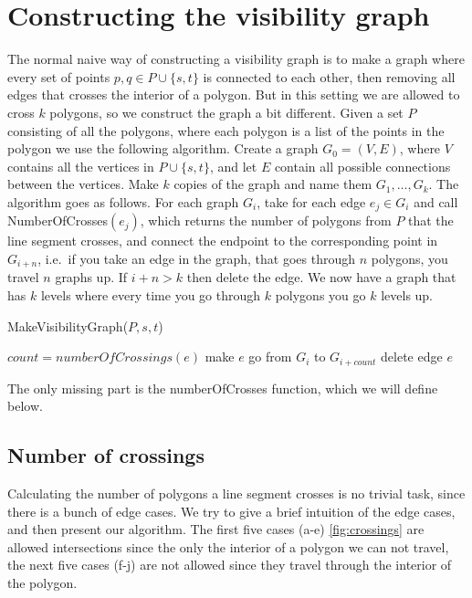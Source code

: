 \section{Constructing the visibility graph}
The normal naive way of constructing a visibility graph is to make a graph
where every set of points $p,q \in P\cup \{s,t\}$ is connected to each other,
then removing all edges that crosses the interior of a polygon. But in this
setting we are allowed to cross $k$ polygons, so we construct the graph a bit
different. Given a set $P$ consisting of all the polygons, where each polygon
is a list of the points in the polygon we use the following algorithm.  Create
a graph $G_0=(V,E)$, where $V$ contains all the vertices in $P\cup \{s,t\}$,
and let $E$ contain all possible connections between the vertices. Make $k$
copies of the graph and name them $G_1,\dots,G_{k}$.  The algorithm goes as
follows. For each graph $G_i$, take for each edge $e_j\in G_i$ and call
NumberOfCrosses$(e_j)$, which returns the number of polygons from $P$ that the
line segment crosses, and connect the endpoint to the corresponding point in
$G_{i+n}$, i.e.\ if you take an edge in the graph, that goes through $n$
polygons, you travel $n$ graphs up. If $i+n>k$ then delete the edge. We now
have a graph that has $k$ levels where every time you go through $k$ polygons
you go $k$ levels up.

\begin{algorithm} 
	\caption{MakeVisibilityGraph($P,s,t$)}
	\begin{algorithmic}[1]
			\State $count = numberOfCrossings(e)$
				\State make $e$ go from $G_i$ to $G_{i+count}$
			\Else
				\State delete edge $e$
			\EndIf
		\EndFor
		\EndFor
	\end{algorithmic}
\end{algorithm}

The only missing part is the numberOfCrosses function, which we will define
below.

\subsection{Number of crossings}
Calculating the number of polygons a line segment crosses is no trivial task,
since there is a bunch of edge cases. We try to give a brief intuition of the
edge cases, and then present our algorithm.
The first five cases (a-e) \ref{fig:crossings} are allowed intersections since
the only the interior of a polygon we can not travel, the
next five cases (f-j) are not allowed since they travel through the interior
of the polygon.

